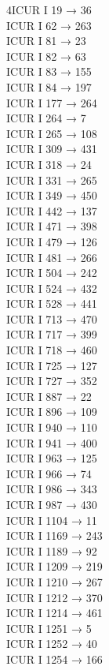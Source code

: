 \begin{multicols}{4}\footnotesize\noindent ICUR I 19 → 36\\
ICUR I 62 → 263\\
ICUR I 81 → 23\\
ICUR I 82 → 63\\
ICUR I 83 → 155\\
ICUR I 84 → 197\\
ICUR I 177 → 264\\
ICUR I 264 → 7\\
ICUR I 265 → 108\\
ICUR I 309 → 431\\
ICUR I 318 → 24\\
ICUR I 331 → 265\\
ICUR I 349 → 450\\
ICUR I 442 → 137\\
ICUR I 471 → 398\\
ICUR I 479 → 126\\
ICUR I 481 → 266\\
ICUR I 504 → 242\\
ICUR I 524 → 432\\
ICUR I 528 → 441\\
ICUR I 713 → 470\\
ICUR I 717 → 399\\
ICUR I 718 → 460\\
ICUR I 725 → 127\\
ICUR I 727 → 352\\
ICUR I 887 → 22\\
ICUR I 896 → 109\\
ICUR I 940 → 110\\
ICUR I 941 → 400\\
ICUR I 963 → 125\\
ICUR I 966 → 74\\
ICUR I 986 → 343\\
ICUR I 987 → 430\\
ICUR I 1104 → 11\\
ICUR I 1169 → 243\\
ICUR I 1189 → 92\\
ICUR I 1209 → 219\\
ICUR I 1210 → 267\\
ICUR I 1212 → 370\\
ICUR I 1214 → 461\\
ICUR I 1251 → 5\\
ICUR I 1252 → 40\\
ICUR I 1254 → 166\\

\end{multicols}
